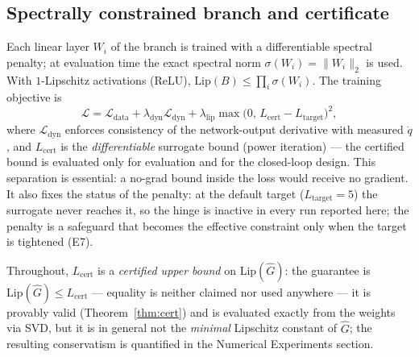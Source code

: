 \documentclass[11pt,sagev,times]{sagej}
\newcommand{\Ghat}{\hat{G}}
\newcommand{\Lhat}{L_{\mathrm{cert}}}
\newcommand{\Ltarget}{L_{\mathrm{target}}}
\begin{document}
\subsection{Spectrally constrained branch and certificate}
Each linear layer $W_i$ of the branch is trained with a differentiable
spectral penalty; at evaluation time the exact spectral norm
$\sigma(W_i)=\|W_i\|_2$ is used. With $1$-Lipschitz activations (ReLU),
$\mathrm{Lip}(B)\le\prod_i \sigma(W_i)$. The training objective is
\begin{equation}
  \mathcal{L} = \mathcal{L}_{\mathrm{data}}
  + \lambda_{\mathrm{dyn}}\mathcal{L}_{\mathrm{dyn}}
  + \lambda_{\mathrm{lip}}\max\!\big(0,\,\Lhat-\Ltarget\big)^2,
  \label{eq:loss}
\end{equation}
where $\mathcal{L}_{\mathrm{dyn}}$ enforces consistency of the network-output
derivative with measured $\dot q$, and $\Lhat$ is the \emph{differentiable}
surrogate bound (power iteration) --- the certified bound is evaluated
only for evaluation and for the closed-loop design. This separation is
essential: a no-grad bound inside the loss would receive no gradient. It also
fixes the status of the penalty: at the default target ($\Ltarget=5$) the
surrogate never reaches it, so the hinge is inactive in every run reported
here; the penalty is a safeguard that becomes the effective constraint only
when the target is tightened (E7).

Throughout, $\Lhat$ is a \emph{certified upper bound} on
$\mathrm{Lip}(\Ghat)$: the guarantee is $\mathrm{Lip}(\Ghat)\le\Lhat$ ---
equality is neither claimed nor used anywhere --- it is provably valid
(Theorem~\ref{thm:cert}) and is evaluated exactly from the weights via SVD,
but it is in general not the \emph{minimal} Lipschitz constant of $\Ghat$;
the resulting conservatism is quantified in the Numerical Experiments section.
\end{document}
